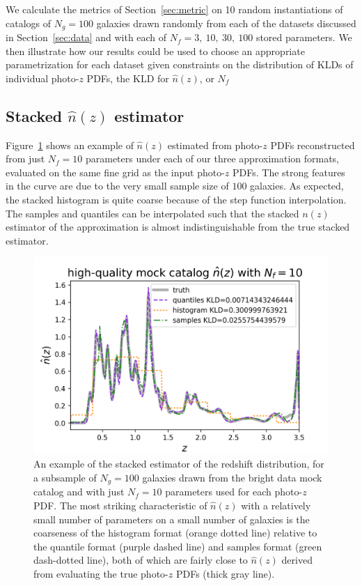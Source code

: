 \documentclass[\docopts]{\docclass}
\newcommand{\pz}{photo-$z$ PDF}
\newcommand{\mgdata}{bright\xspace}
\begin{document}
We calculate the metrics of Section~\ref{sec:metric} on 10 random 
instantiations of catalogs of $N_{g}=100$ galaxies drawn randomly from each of 
the datasets discussed in Section~\ref{sec:data} and with each of $N_{f}=3,\ 
10,\ 30,\ 100$ stored parameters.
We then illustrate how our results could be used to choose an appropriate 
parametrization for each dataset given constraints on the distribution of KLDs 
of individual \pz s, the KLD for $\hat{n}(z)$, or $N_{f}$


\subsection{Stacked $\hat{n}(z)$ estimator}
\label{sec:stacked_results}

Figure~\ref{fig:stacked} shows an example of $\hat{n}(z)$ estimated from \pz s 
reconstructed from just $N_{f}=10$ parameters under each of our three 
approximation formats, evaluated on the same fine grid as the input \pz s.
The strong features in the curve are due to the very small sample size of $100$ 
galaxies.
As expected, the stacked histogram is quite coarse because of the step function 
interpolation.
The samples and quantiles can be interpolated such that the stacked $n(z)$ 
estimator of the approximation is almost indistinguishable from the true 
stacked estimator.


\begin{figure}
  \begin{center}
    \includegraphics[width=\columnwidth]{figures/stacked.png}
    \caption{An example of the stacked estimator of the redshift distribution, 
for a subsample of $N_{g}=100$ galaxies drawn from the \mgdata data mock 
catalog and with just $N_{f}=10$ parameters used for each \pz.
    The most striking characteristic of $\hat{n}(z)$ with a relatively small 
number of parameters on a small number of galaxies is the coarseness of the 
histogram format (orange dotted line) relative to the quantile format (purple 
dashed line) and samples format (green dash-dotted line), both of which are 
fairly close to $\hat{n}(z)$ derived from evaluating the true \pz s (thick gray 
line).
    \label{fig:stacked}}
  \end{center}
\end{figure}
\end{document}
